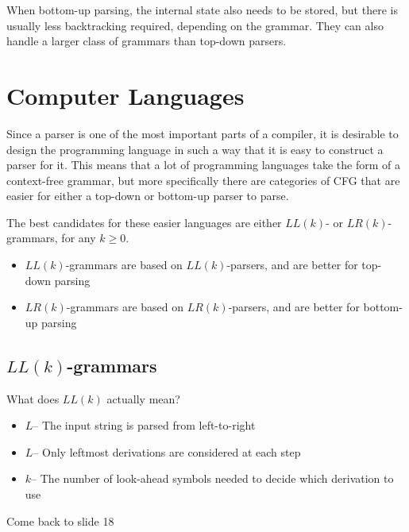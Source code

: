 When bottom-up parsing, the internal state also needs to be stored, but there is usually less backtracking required,
 depending on the grammar. They can also handle a larger class of grammars than top-down parsers.

\section*{Computer Languages}

Since a parser is one of the most important parts of a compiler, it is desirable to design the programming language in
 such a way that it is easy to construct a parser for it. This means that a lot of programming languages take the form
 of a context-free grammar, but more specifically there are categories of CFG that are easier for either a top-down or
 bottom-up parser to parse.

The best candidates for these easier languages are either $LL(k)$- or $LR(k)$-grammars, for any $k \geq 0$.
\begin{itemize}
  \item $LL(k)$-grammars are based on $LL(k)$-parsers, and are better for top-down parsing
  \item $LR(k)$-grammars are based on $LR(k)$-parsers, and are better for bottom-up parsing
\end{itemize}

\subsection*{$LL(k)$-grammars}

What does $LL(k)$ actually mean?
\begin{itemize}
  \item $L$-- The input string is parsed from left-to-right
  \item $L$-- Only leftmost derivations are considered at each step
  \item $k$-- The number of look-ahead symbols needed to decide which derivation to use
\end{itemize}

{\Huge Come back to slide 18}